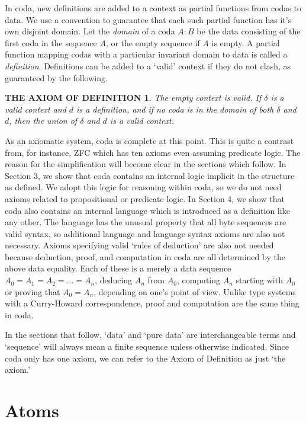 \documentclass[11pt]{article}
\begin{document}
     In coda, new definitions are added to a context as partial functions from codas to data.  We use a convention to guarantee that each such partial
function has it's own disjoint domain.  Let the {\it domain} of a coda $A:B$ be the data consisting of the first coda in the sequence $A$, or the empty
sequence if $A$ is empty.  A partial function mapping codas with a particular invariant domain to data is called a {\it definition}.  Definitions
can be added to a `valid' context if they do not clash, as guaranteed by the following.
\newtheorem*{remark}{THE AXIOM OF DEFINITION}
\begin{remark}  The empty context is valid.  If $\delta$ is a valid context and $d$ is a definition, and if no coda is in
the domain of both $\delta$ and $d$, then the union of $\delta$ and $d$ is a valid context.
\end{remark}
\noindent As an axiomatic system, coda is complete at this point.  This is quite a contrast from, for instance, ZFC which has ten axioms
even assuming predicate logic\cite{ZFC}.  The reason for the simplification will become clear in the sections which follow.  In Section 3, we show
that coda contains an internal logic implicit in the structure as defined.  We adopt this logic for reasoning within coda, so we do not
need axioms related to propositional or predicate logic.  In Section 4, we show that coda also contains an internal language which is introduced 
as a definition like any other.  The language has the unusual property that all byte sequences are valid syntax,
so additional language and language syntax axioms are also not necessary.  Axioms specifying valid `rules of deduction' are also not needed
because deduction, proof, and computation in coda are all determined by the above data equality.  Each of these is a merely a data sequence $A_0=A_1=A_2=\dots=A_n$,
deducing $A_n$ from $A_0$, computing $A_n$ starting with $A_0$ or proving that $A_0=A_n$, depending on one's point of view.
Unlike type systems with a Curry-Howard correspondence, proof and computation are the same thing in coda.

In the sections that follow,
`data' and `pure data' are interchangeable terms and `sequence' will always mean a finite sequence unless otherwise indicated.  Since coda
only has one axiom, we can refer to the Axiom of Definition as just `the axiom.'

\section{Atoms}
\end{document}
